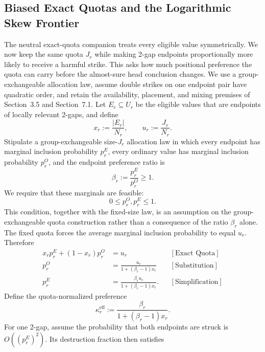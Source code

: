 \subsection{Biased Exact Quotas and the Logarithmic Skew Frontier}
The neutral exact-quota companion treats every eligible value symmetrically. We now keep the same quota $J_r$ while making 2-gap endpoints proportionally more likely to receive a harmful strike. This asks how much positional preference the quota can carry before the almost-sure head conclusion changes. We use a group-exchangeable allocation law, assume double strikes on one endpoint pair have quadratic order, and retain the availability, placement, and mixing premises of Section~3.5 and Section~7.1.
Let $E_r\subseteq U_r$ be the eligible values that are endpoints of locally relevant 2-gaps, and define
\begin{equation*}
x_r:=\frac{|E_r|}{N_r},
\qquad
u_r:=\frac{J_r}{N_r}.
\end{equation*}
Stipulate a group-exchangeable size-$J_r$ allocation law in which every endpoint has marginal inclusion probability $p_r^{E}$, every ordinary value has marginal inclusion probability $p_r^{O}$, and the endpoint preference ratio is
\begin{equation*}
\beta_r:=\frac{p_r^{E}}{p_r^{O}}\ge1.
\end{equation*}
We require that these marginals are feasible:
\begin{equation*}
0\le p_r^{O},p_r^{E}\le1.
\end{equation*}
This condition, together with the fixed-size law, is an assumption on the group-exchangeable quota construction rather than a consequence of the ratio $\beta_r$ alone.
The fixed quota forces the average marginal inclusion probability to equal $u_r$. Therefore
\begin{equation*}
\begin{aligned}
x_rp_r^{E}+(1-x_r)p_r^{O}
&=u_r
&&[\text{Exact Quota}]\\
p_r^{O}
&=\frac{u_r}{1+(\beta_r-1)x_r}
&&[\text{Substitution}]\\
p_r^{E}
&=\frac{\beta_ru_r}{1+(\beta_r-1)x_r}.
&&[\text{Simplification}]
\end{aligned}
\end{equation*}
Define the quota-normalized preference
\begin{equation*}
\kappa_r^{\mathrm{eff}}
:=
\frac{\beta_r}{1+(\beta_r-1)x_r}.
\end{equation*}
For one 2-gap, assume the probability that both endpoints are struck is $O((p_r^{E})^2)$. Its destruction fraction then satisfies
